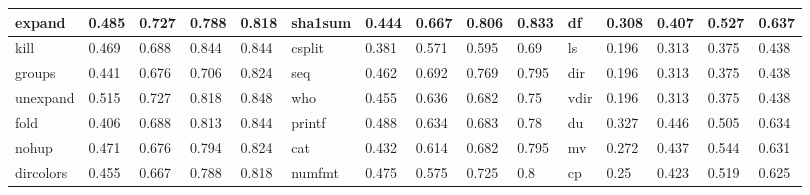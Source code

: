 \begin{table*}[h!]
\begin{center}
\begin{tabular}{ | l | l | l | l | l | l | l | l | l | l | l | l | l | l | l | }
	expand & 0.485 & 0.727 & 0.788 & 0.818 & sha1sum & 0.444 & 0.667 & 0.806 & 0.833 & df & 0.308 & 0.407 & 0.527 & 0.637 \\ \hline
	kill & 0.469 & 0.688 & 0.844 & 0.844 & csplit & 0.381 & 0.571 & 0.595 & 0.69 & ls & 0.196 & 0.313 & 0.375 & 0.438 \\ \hline
	groups & 0.441 & 0.676 & 0.706 & 0.824 & seq & 0.462 & 0.692 & 0.769 & 0.795 & dir & 0.196 & 0.313 & 0.375 & 0.438 \\ \hline
	unexpand & 0.515 & 0.727 & 0.818 & 0.848 & who & 0.455 & 0.636 & 0.682 & 0.75 & vdir & 0.196 & 0.313 & 0.375 & 0.438 \\ \hline
	fold & 0.406 & 0.688 & 0.813 & 0.844 & printf & 0.488 & 0.634 & 0.683 & 0.78 & du & 0.327 & 0.446 & 0.505 & 0.634 \\ \hline
	nohup & 0.471 & 0.676 & 0.794 & 0.824 & cat & 0.432 & 0.614 & 0.682 & 0.795 & mv & 0.272 & 0.437 & 0.544 & 0.631 \\ \hline
	dircolors & 0.455 & 0.667 & 0.788 & 0.818 & numfmt & 0.475 & 0.575 & 0.725 & 0.8 & cp & 0.25 & 0.423 & 0.519 & 0.625 \\ \hline
\end{tabular}
\end{center}
\end{table*}



